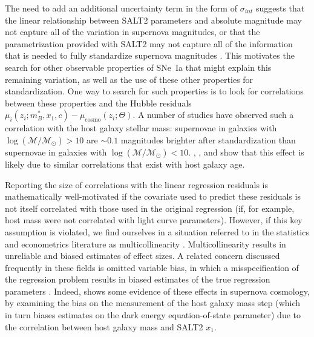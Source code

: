 The need to add an additional uncertainty term in the form of $\sigma_{int}$ suggests that the linear relationship between SALT2 parameters and absolute magnitude may not capture all of the variation in supernova magnitudes, or that the parametrization provided with SALT2 may not capture all of the information that is needed to fully standardize supernova magnitudes \citep{saunders_snemo_2018}. This motivates the search for other observable properties of SNe~Ia that might explain this remaining variation, as well as the use of these other properties for standardization. One way to search for such properties is to look for correlations between these properties and the Hubble residuals $\mu_i(z_i;m_B^*, x_1, c)-\mu_\text{cosmo}(z_i;\Theta)$. A number of studies \citep{kelly_hubble_2010, lampeitl_effect_2010, sullivan_dependence_2010, childress_host_2013} have observed such a correlation with the host galaxy stellar mass: supernovae in galaxies with $\log(\mathcal{M}/\mathcal{M}_\odot) > 10$ are $\sim0.1$ magnitudes brighter after standardization than supernovae in galaxies with $\log(\mathcal{M}/\mathcal{M}_\odot) < 10$. \cite{rigault_evidence_2013}, \cite{childress_ages_2014}, and  \cite{rigault_confirmation_2015} show that this effect is likely due to similar correlations that exist with host galaxy age.

Reporting the size of correlations with the linear regression residuals is mathematically well-motivated if the covariate used to predict these residuals is not itself correlated with those used in the original regression (if, for example, host mass were not correlated with light curve parameters). However, if this key assumption is violated, we find ourselves in a situation referred to in the statistics and econometrics literature as multicollinearity \cite[e.g.][]{farrar_multicollinearity_1967}. Multicollinearity results in unreliable and biased estimates of effect sizes.  A related concern discussed frequently  in these fields is omitted variable bias, in which a misspecification of the regression problem results in biased estimates of the true regression parameters \citep{clarke_phantom_2005, wooldridge_introductory_2013}. Indeed, \cite{smith_first_2020} shows some evidence of these effects in supernova cosmology, by  examining the bias on the measurement of the host galaxy mass step (which in turn biases estimates on the dark energy equation-of-state parameter) due to the correlation between host galaxy mass and SALT2 $x_1$.

